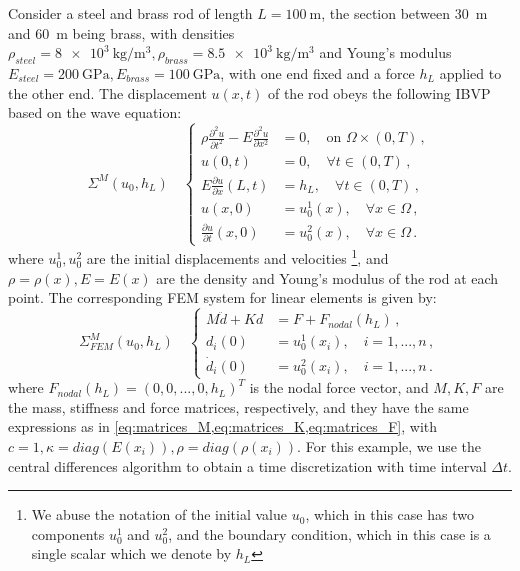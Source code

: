 \documentclass[letterpaper, 10 pt, conference]{ieeeconf/ieeeconf}
\begin{document}
Consider a steel and brass rod of length $L = \SI{100}{\m}$, the section between 
\SI{30}{\m} and \SI{60}{\m} being brass, with densities $\rho_{steel} =
\SI{8e3}{\kg\per\m^3}, \rho_{brass} = \SI{8.5e3}{\kg\per\m^3}$ and Young's
modulus $E_{steel} = \SI{200}{\giga\pascal}, E_{brass} =
\SI{100}{\giga\pascal}$,
with one end fixed and a force $h_L$ applied to the
other end. The displacement $u(x, t)$ of the rod obeys the following
IBVP based on the wave equation:
%
\begin{equation}\label{eq:pde_mech}
    \Sigma^{M}(u_0, h_L) \quad \left \{
    \begin{aligned}
        \rho \frac{\partial^2 u}{\partial t^2} - E \frac{\partial^2
        u}{\partial x^2} &= 0, \quad \text{on } \Omega \times (0, T) \,, \\
        u(0, t) &= 0, \quad \forall t \in (0, T) \,, \\
        E \frac{\partial u}{\partial x}(L, t) &= h_L, \quad 
        \forall t \in (0, T) \,, \\
        u(x, 0) &= u_0^1(x), \quad \forall x \in \Omega \,, \\
        \frac{\partial u}{\partial t}(x, 0) &= u_0^2(x), \quad \forall x \in \Omega \,.
    \end{aligned}
    \right.
\end{equation}
%
where $u_0^1, u_0^2$ are the initial displacements and velocities
\footnote{We abuse the notation of the initial value $u_0$, which in this
case has two components $u_0^1$ and $u_0^2$, and the boundary condition, which
in this case is a single scalar which we denote by $h_L$}, and $\rho =
\rho(x), E = E(x)$ are
the density and Young's modulus of the rod at each point.
The corresponding FEM system for linear elements is given by:
%
\begin{equation}\label{eq:fem_mech}
    \Sigma^M_{FEM}(u_0, h_L) \quad \left \{
    \begin{aligned}
        M\ddot{d} + K d &= F + F_{nodal}(h_L) \,, \\
        d_i(0) &= u_0^1(x_i), \quad i = 1,...,n \,, \\
        \dot{d}_i(0) &= u_0^2(x_i), \quad i = 1,...,n \,.
    \end{aligned}
    \right.
\end{equation}
%
where $F_{nodal}(h_L) = (0, 0, ..., 0, h_L)^T$ is the nodal force vector, and $M, K, F$ 
are the mass, stiffness and force matrices, respectively, and
they have the same expressions as in
\cref{eq:matrices_M,eq:matrices_K,eq:matrices_F}, with $c = 1, \kappa =
diag(E(x_i)), \rho = diag(\rho(x_i))$.
For this example, we use the central differences algorithm
\cite{hughes_finite_2000} to obtain a time
discretization with time interval $\Delta t$. 
\end{document}
